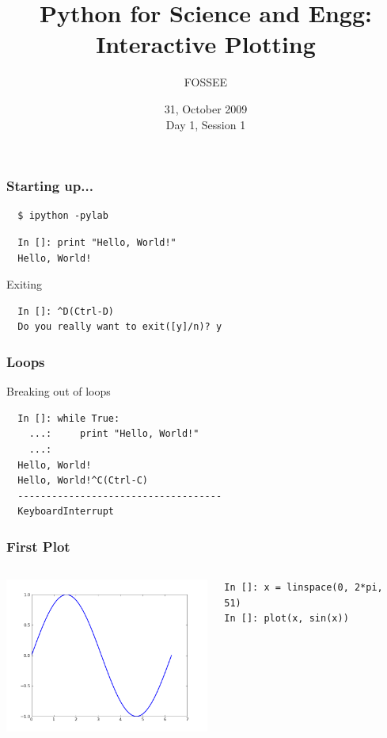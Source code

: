 \documentclass[14pt,compress]{beamer}
\title[Interactive Plotting]{Python for Science and Engg: Interactive Plotting}
\author[FOSSEE] {FOSSEE}
\institute[IIT Bombay] {Department of Aerospace Engineering\\IIT Bombay}
\date[] {31, October 2009\\Day 1, Session 1}
\begin{document}
\begin{frame}
  \maketitle
\end{frame}



\begin{frame}[fragile]
\frametitle{Starting up...}
\begin{block}{}
\begin{verbatim}
  $ ipython -pylab  
\end{verbatim}
\end{block}
\begin{lstlisting}     
  In []: print "Hello, World!"
  Hello, World!
\end{lstlisting}
Exiting
\begin{lstlisting}     
  In []: ^D(Ctrl-D)
  Do you really want to exit([y]/n)? y
\end{lstlisting}
\end{frame}

\begin{frame}[fragile]
\frametitle{Loops}
Breaking out of loops
\begin{lstlisting}     
  In []: while True:
    ...:     print "Hello, World!"
    ...:     
  Hello, World!
  Hello, World!^C(Ctrl-C)
  ------------------------------------
  KeyboardInterrupt                   

\end{lstlisting}
\end{frame}

\begin{frame}[fragile]
\frametitle{First Plot}
\begin{columns}
    \hspace*{-0.5in}
  \includegraphics[height=2in, interpolate=true]{data/firstplot}
    \begin{block}{}
    \small
\begin{lstlisting}
In []: x = linspace(0, 2*pi, 51)
In []: plot(x, sin(x))
\end{lstlisting}
    \small
    \end{block}
\end{columns}
\end{frame}
\end{document}
